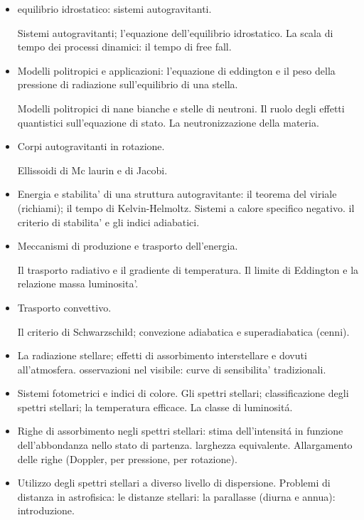 \documentclass[oneside,12pt,fleqn]{memoir}
\begin{document}
\begin{itemize}
    \item equilibrio idrostatico: sistemi autogravitanti.
    
Sistemi autogravitanti; l'equazione dell'equilibrio idrostatico. La scala di tempo dei processi dinamici: il tempo di free fall.

\item Modelli politropici e applicazioni: l'equazione di eddington e il peso della pressione di radiazione sull'equilibrio di una stella. 

Modelli politropici di nane bianche e stelle di neutroni. Il ruolo degli effetti quantistici sull'equazione di stato. La neutronizzazione della materia.

\item Corpi autogravitanti in rotazione.

Ellissoidi di Mc laurin e di Jacobi. 

\item Energia e stabilita' di una struttura autogravitante: il teorema del viriale (richiami); il tempo di Kelvin-Helmoltz. Sistemi a calore specifico negativo.
il criterio di stabilita' e gli indici adiabatici.

\item Meccanismi di produzione e trasporto dell'energia.

Il trasporto radiativo e il gradiente di temperatura. Il limite di Eddington e la relazione massa luminosita'. 

\item Trasporto convettivo.

Il criterio di Schwarzschild; convezione adiabatica e superadiabatica (cenni).

\item La radiazione stellare; effetti di assorbimento interstellare e dovuti all'atmosfera. osservazioni nel visibile: curve di sensibilita' tradizionali. 

\item Sistemi fotometrici e indici di colore. Gli spettri stellari; classificazione degli spettri stellari; la temperatura efficace. La classe di luminosit\'a.

\item Righe di assorbimento negli spettri stellari: stima dell'intensit\'a in funzione dell'abbondanza nello stato di partenza. larghezza equivalente. Allargamento delle righe (Doppler, per pressione, per rotazione).

\item Utilizzo degli spettri stellari a diverso livello di dispersione. Problemi di distanza in astrofisica: le distanze stellari: la parallasse (diurna e annua): introduzione.


\end{itemize}
\end{document}
